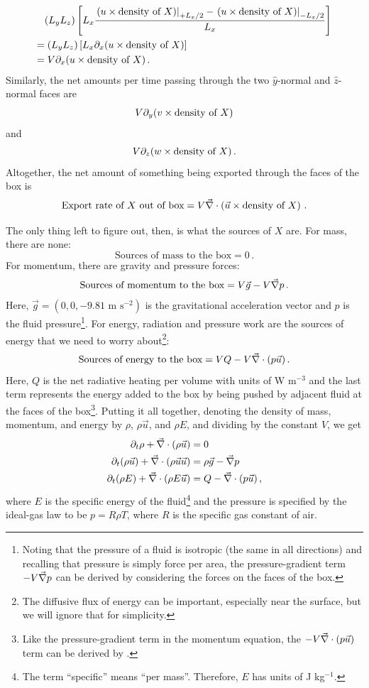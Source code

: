 \documentclass[12pt]{article}
\begin{document}
\begin{align}
& (L_y L_z) \left[ L_x \frac{\left.(u\times\text{density of $X$})\right|_{+L_x/2} - \left.(u\times\text{density of $X$})\right|_{-L_x/2}}{L_x} \right] \\
=& \; (L_y L_z) \left[ L_x \partial_x (u\times\text{density of $X$}) \right] \\
=& \; V \partial_x (u\times\text{density of $X$}) \, .
\end{align}
Similarly, the net amounts per time passing through the two $\hat{y}$-normal and $\hat{z}$-normal faces are
\[
V \partial_y (v\times\text{density of $X$})
\]
and
\[
V \partial_z (w\times\text{density of $X$}) \, .
\]
Altogether, the net amount of something being exported through the faces of the box is
\[
\text{Export rate of $X$ out of box} = V {\vec{\nabla}} \cdot \left(\vec{u} \times \text{density of $X$} \right) \, .
\]


The only thing left to figure out, then, is what the sources of $X$ are.  For mass, there are none:
\[
\text{Sources of mass to the box} = 0 \, .
\]
For momentum, there are gravity and pressure forces:
\[
\text{Sources of momentum to the box} = V \vec{g} - V {\vec{\nabla}} p \, .
\]
Here, $\vec{g} = (0,0,-9.81\text{ m s$^{-2}$})$ is the gravitational acceleration vector and $p$ is the fluid pressure\footnote{Noting that the pressure of a fluid is isotropic (the same in all directions) and recalling that pressure is simply force per area, the pressure-gradient term $-V {\vec{\nabla}} p$ can be derived by considering the forces on the faces of the box.}.  For energy, radiation and pressure work are the sources of energy that we need to worry about\footnote{The diffusive flux of energy can be important, especially near the surface, but we will ignore that for simplicity.}:
\[
\text{Sources of energy to the box} = V Q - V {\vec{\nabla}} \cdot (p \vec{u})\, .
\]
Here, $Q$ is the net radiative heating per volume with units of W m$^{-3}$ and the last term represents the energy added to the box by being pushed by adjacent fluid at the faces of the box\footnote{Like the pressure-gradient term in the momentum equation, the $-V {\vec{\nabla}} \cdot (p \vec{u})$ term can be derived by .}.  Putting it all together, denoting the density of mass, momentum, and energy by $\rho$, $\rho\vec{u}$, and $\rho E$, and dividing by the constant $V$, we get
\begin{align}
\partial_t \rho + {\vec{\nabla}} \cdot (\rho \vec{u}) &= 0 \label{mass_eulerian} \\
\partial_t (\rho \vec{u}) + {\vec{\nabla}} \cdot (\rho \vec{u} \vec{u}) &= \rho \vec{g} - {\vec{\nabla}} p \label{momentum_eulerian} \\
\partial_t (\rho E) + {\vec{\nabla}} \cdot (\rho E \vec{u}) &= Q - {\vec{\nabla}} \cdot (p \vec{u}) \, , \label{energy_eulerian}
\end{align}
where $E$ is the specific energy of the fluid\footnote{The term ``specific'' means ``per mass''.  Therefore, $E$ has units of J kg$^{-1}$.} and the pressure is specified by the ideal-gas law to be $p=R\rho T$, where $R$ is the specific gas constant of air.
\end{document}
